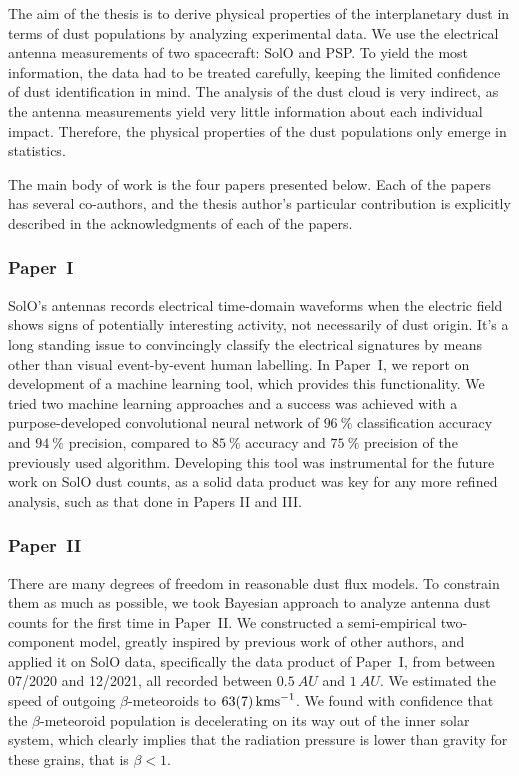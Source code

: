 The aim of the thesis is to derive physical properties of the interplanetary dust in terms of dust populations by analyzing experimental data. We use the electrical antenna measurements of two spacecraft: SolO and PSP. To yield the most information, the data had to be treated carefully, keeping the limited confidence of dust identification in mind. The analysis of the dust cloud is very indirect, as the antenna measurements yield very little information about each individual impact. Therefore, the physical properties of the dust populations only emerge in statistics. 

The main body of work is the four papers presented below. Each of the papers has several co-authors, and the thesis author's particular contribution is explicitly described in the acknowledgments of each of the papers.

\subsubsection{Paper~I}

SolO's antennas records electrical time-domain waveforms when the electric field shows signs of potentially interesting activity, not necessarily of dust origin. It's a long standing issue to convincingly classify the electrical signatures by means other than visual event-by-event human labelling. In Paper~I, we report on development of a machine learning tool, which provides this functionality. We tried two machine learning approaches and a success was achieved with a purpose-developed convolutional neural network of $\SI{96}{\%}$ classification accuracy and $\SI{94}{\%}$ precision, compared to $\SI{85}{\%}$ accuracy and $\SI{75}{\%}$ precision of the previously used algorithm. Developing this tool was instrumental for the future work on SolO dust counts, as a solid data product was key for any more refined analysis, such as that done in Papers II and III. 

\subsubsection{Paper~II}

There are many degrees of freedom in reasonable dust flux models. To constrain them as much as possible, we took Bayesian approach to analyze antenna dust counts for the first time in Paper~II. We constructed a semi-empirical two-component model, greatly inspired by previous work of other authors, and applied it on SolO data, specifically the data product of Paper~I, from between 07/2020 and 12/2021, all recorded between $\SI{0.5}{AU}$ and $\SI{1}{AU}$. We estimated the speed of outgoing $\beta$-meteoroids to $\SI{63 \pm 7}{kms^{-1}}$. We found with confidence that the $\beta$-meteoroid population is decelerating on its way out of the inner solar system, which clearly implies that the radiation pressure is lower than gravity for these grains, that is $\beta < 1$. 

